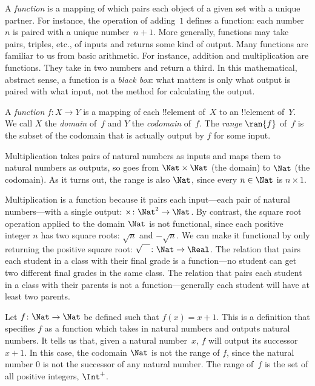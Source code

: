 \documentclass[../../../include/open-logic-section]{subfiles}
\begin{document}

\begin{explain}
A \emph{function} is a mapping of which pairs each object of a given
set with a unique partner. For instance, the operation of adding~$1$
defines a function: each number~$n$ is paired with a unique
number~$n+1$. More generally, functions may take pairs, triples, etc.,
of inputs and returns some kind of output. Many functions are familiar
to us from basic arithmetic. For instance, addition and multiplication
are functions. They take in two numbers and return a third.  In this
mathematical, abstract sense, a function is a \emph{black box}: what
matters is only what output is paired with what input, not the method
for calculating the output.
\end{explain}

\begin{defn}
A \emph{function} $f \colon X \to Y$ is a mapping of each !!{element}
of~$X$ to an !!{element} of~$Y$. We call $X$ the \emph{domain} of~$f$
and $Y$ the \emph{codomain} of~$f$. The \emph{range} $\ran{f}$ of~$f$
is the subset of the codomain that is actually output by $f$ for some
input.
\end{defn}

\begin{ex}
Multiplication takes pairs of natural numbers as inputs and maps them
to natural numbers as outputs, so goes from $\Nat \times \Nat$ (the
domain) to $\Nat$ (the codomain). As it turns out, the range is also
$\Nat$, since every $n \in \Nat$ is $n \times 1$.
\end{ex}

\begin{explain}
Multiplication is a function because it pairs each input---each pair
of natural numbers---with a single output: $\times \colon \Nat^2 \to
\Nat$. By contrast, the square root operation applied to the domain
$\Nat$ is not functional, since each positive integer $n$ has two
square roots: $\sqrt{n}$ and $-\sqrt{n}$. We can make it functional by
only returning the positive square root: $\sqrt{\phantom{X}} \colon
\Nat \to \Real$. The relation that pairs each student in a class with
their final grade is a function---no student can get two different
final grades in the same class. The relation that pairs each student
in a class with their parents is not a function---generally each
student will have at least two parents.
\end{explain}

\begin{ex}
Let $f \colon \Nat \to \Nat$ be defined such that $f(x) = x+1$. This
is a definition that specifies $f$ as a function which takes in
natural numbers and outputs natural numbers. It tells us that, given a
natural number~$x$, $f$ will output its successor~$x+1$.
In this case, the codomain $\Nat$ is not the range of $f$, since the
natural number $0$ is not the successor of any natural number. The
range of~$f$ is the set of all positive integers, $\Int^{+}$.
\end{ex}
\end{document}
